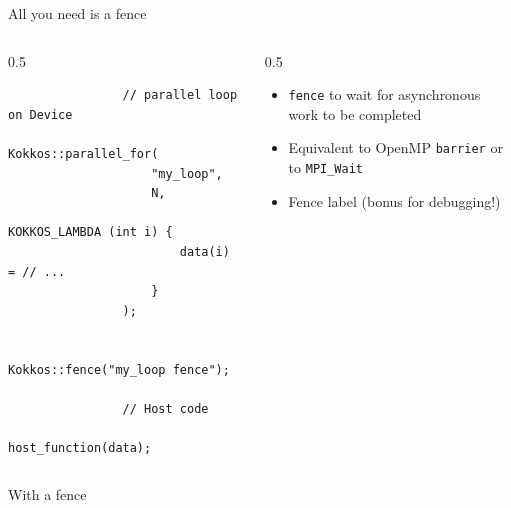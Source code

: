 \documentclass[
    aspectratio=169,
    \createHandout
]{beamer}
\begin{document}
\begin{frame}[fragile]{All you need is a fence}
    \begin{columns}
        \begin{column}{0.5\linewidth}
            \begin{verbatim}
                // parallel loop on Device
                Kokkos::parallel_for(
                    "my_loop",
                    N,
                    KOKKOS_LAMBDA (int i) {
                        data(i) = // ...
                    }
                );

                Kokkos::fence("my_loop fence");

                // Host code
                host_function(data);
            \end{verbatim}
        \end{column}
        \begin{column}{0.5\linewidth}
            \begin{itemize}
                \item \texttt{fence} to wait for asynchronous work to be completed
                \item Equivalent to OpenMP \texttt{barrier} or to \texttt{MPI\_Wait}
                \item Fence label (bonus for debugging!)
            \end{itemize}
        \end{column}
    \end{columns}

    \vspace{1em}
     With a fence
\end{frame}

\end{document}
